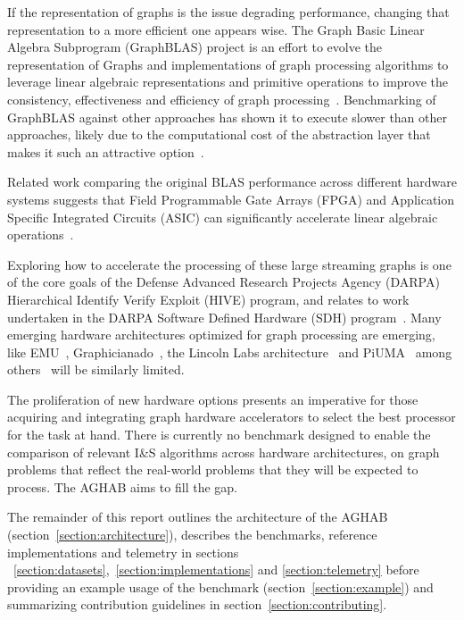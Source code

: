 {If the representation of graphs is the issue degrading performance, changing that representation to a more efficient one appears wise. 
The Graph Basic Linear Algebra Subprogram (GraphBLAS) project is an effort to evolve the representation of Graphs and implementations of graph processing algorithms to leverage linear algebraic representations and primitive operations to improve the consistency, effectiveness and efficiency of graph processing~\cite{Mattson2013,Mattson2019,Kepner2015,Kepner2016,Brock2021}.
Benchmarking of GraphBLAS against other approaches has shown it to execute slower than other approaches, likely due to the computational cost of the abstraction layer that makes it such an attractive option~\cite{Azad2020}. 

Related work comparing the original BLAS performance across different hardware systems suggests that Field Programmable Gate Arrays (FPGA) and Application Specific Integrated Circuits (ASIC) can significantly accelerate linear algebraic operations~\cite{Kestur2010,Xiong2020}.

Exploring how to accelerate the processing of these large streaming graphs is one of the core goals of the Defense Advanced Research Projects Agency (DARPA) Hierarchical Identify Verify Exploit (HIVE) program, and relates to work undertaken in the DARPA Software Defined Hardware (SDH) program~\cite{Regli2022b}.
Many emerging hardware architectures optimized for graph processing are emerging, like EMU~\cite{Dysart2016}, Graphicianado~\cite{Ham2016}, the Lincoln Labs architecture~\cite{Song2016} and PiUMA~\cite{Aananthakrishnan2020} among others~\cite{Peccerillo2022} will be similarly limited.

The proliferation of new hardware options presents an imperative for those acquiring and integrating graph hardware accelerators to select the best processor for the task at hand. 
There is currently no benchmark designed to enable the comparison of relevant I\&S algorithms across hardware architectures, on graph problems that reflect the real-world problems that they will be expected to process. 
The AGHAB aims to fill the gap. 

The remainder of this report outlines the architecture of the AGHAB (section~\ref{section:architecture}), describes the benchmarks, reference implementations and telemetry in sections ~\ref{section:datasets},~\ref{section:implementations} and \ref{section:telemetry} before providing an example usage of the benchmark (section~\ref{section:example}) and summarizing contribution guidelines in section~\ref{section:contributing}.

}

